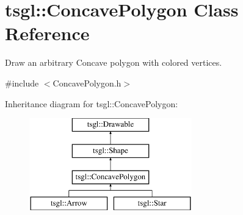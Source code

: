 \hypertarget{classtsgl_1_1_concave_polygon}{}\section{tsgl\+:\+:Concave\+Polygon Class Reference}
\label{classtsgl_1_1_concave_polygon}


Draw an arbitrary Concave polygon with colored vertices.  




{\ttfamily \#include $<$Concave\+Polygon.\+h$>$}

Inheritance diagram for tsgl\+:\+:Concave\+Polygon\+:\begin{figure}[H]
\begin{center}
\leavevmode
\includegraphics[height=4.000000cm]{classtsgl_1_1_concave_polygon}
\end{center}
\end{figure}
